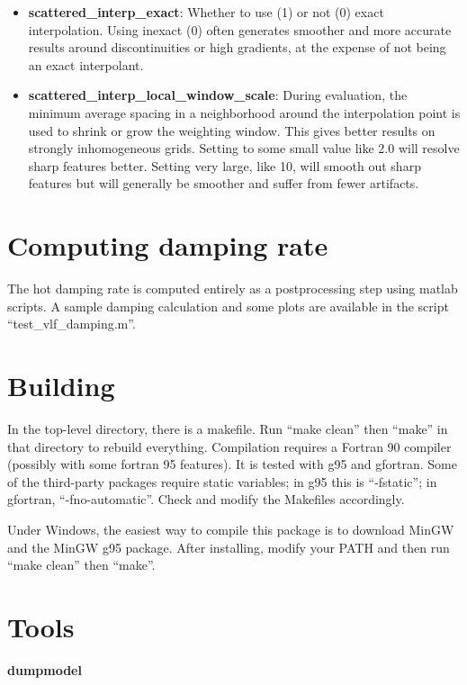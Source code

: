 \documentclass[10pt]{article}
\begin{document}
\begin{itemize}
\begin{itemize}
    \item{\bf scattered\_interp\_exact}:
      Whether to use (1) or not (0) exact interpolation.  Using
      inexact (0) often generates smoother and more accurate results
      around discontinuities or high gradients, at the expense of not 
      being an exact interpolant.
    \item{\bf scattered\_interp\_local\_window\_scale}:
      During evaluation, the minimum average spacing in a neighborhood
      around the interpolation point is used to shrink or grow the
      weighting window.  This gives better results on strongly
      inhomogeneous grids.  Setting to some small value like 2.0 will
      resolve sharp features better.  Setting very large, like 10,
      will smooth out sharp features but will generally be smoother
      and suffer from fewer artifacts.
    \end{itemize}
\end{itemize}

\section{Computing damping rate}
The hot damping rate is computed entirely as a postprocessing step
using matlab scripts.  A sample damping calculation and some plots are
available in the script ``test\_vlf\_damping.m''. 

\section{Building}

In the top-level directory, there is a makefile.  Run ``make clean''
then ``make'' in that directory to rebuild everything.  Compilation
requires a Fortran 90 compiler (possibly with some fortran 95
features).  It is tested with g95 and gfortran.  Some of the
third-party packages require static variables; in g95 this is
``-fstatic''; in gfortran, ``-fno-automatic''.  Check and modify the
Makefiles accordingly.

Under Windows, the easiest way to compile this package is to download
MinGW and the MinGW g95 package.  After installing, modify your PATH
and then run ``make clean'' then ``make''.

\section{Tools}

{\bf dumpmodel}
\end{document}
